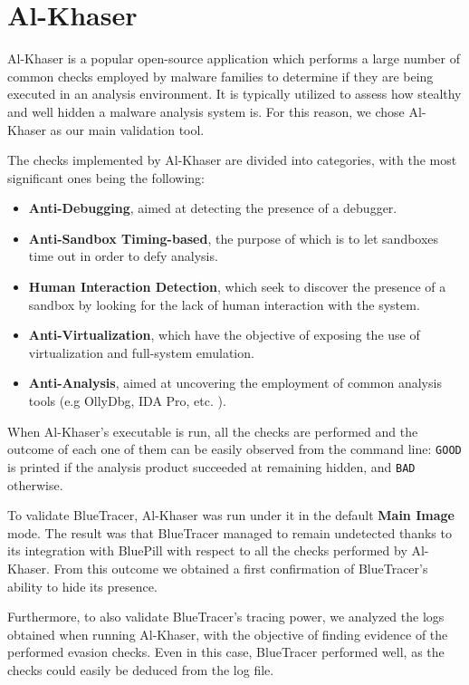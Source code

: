 \vspace{-1cm}
\section{Al-Khaser} \label{Alk}
Al-Khaser \cite{AlK} is a popular open-source application which performs a large number of common checks employed by malware families to determine if they are being executed in an analysis environment. It is typically utilized to assess how stealthy and well hidden a malware analysis system is. For this reason, we chose Al-Khaser as our main validation tool.

The checks implemented by Al-Khaser are divided into categories, with the most significant ones being the following:
\begin{itemize}
\item \textbf{Anti-Debugging}, aimed at detecting the presence of a debugger.
\item \textbf{Anti-Sandbox Timing-based}, the purpose of which is to let sandboxes time out in order to defy analysis. 
\item \textbf{Human Interaction Detection}, which seek to discover the presence of a sandbox by looking for the lack of human interaction with the system.
\item \textbf{Anti-Virtualization}, which have the objective of exposing the use of virtualization and full-system emulation. 
\item \textbf{Anti-Analysis}, aimed at uncovering the employment of common analysis tools (e.g OllyDbg, IDA Pro, etc. ).
\end{itemize}  

When Al-Khaser's executable is run, all the checks are performed and the outcome of each one of them can be easily observed from the command line: \texttt{GOOD} is printed if the analysis product succeeded at remaining hidden, and \texttt{BAD} otherwise. 

To validate BlueTracer, Al-Khaser was run under it in the default \textbf{Main Image} mode. The result was that BlueTracer managed to remain undetected thanks to its integration with BluePill with respect to all the checks performed by Al-Khaser. From this outcome we obtained a first confirmation of BlueTracer's ability to hide its presence. 

Furthermore, to also validate BlueTracer's tracing power, we analyzed the logs obtained when running Al-Khaser, with the objective of finding evidence of the performed evasion checks.
Even in this case, BlueTracer performed well, as the checks could easily be deduced from the log file. 


